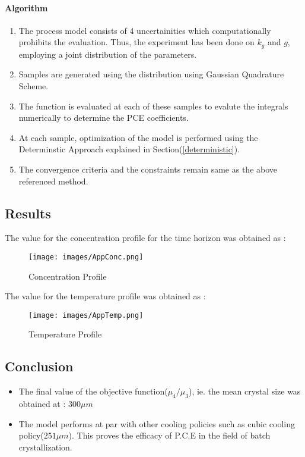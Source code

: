 \documentclass[3p,times,authoryear]{elsarticle}
\begin{document}
\paragraph{Algorithm}
\begin{enumerate}
\item The process model consists of 4 uncertainities which computationally prohibits the evaluation. Thus, the experiment has been done on $k_{g}$ and $g$, employing a joint distribution of the parameters.
\item Samples are generated using the distribution using Gaussian Quadrature Scheme.
\item The function is evaluated at each of these samples to evalute the integrals numerically to determine the PCE coefficients.
\item At each sample, optimization of the model is performed using the Determinstic Approach explained in Section(\ref{deterministic}).
\item The convergence criteria and the constraints remain same as the above referenced method.
\end{enumerate}

\subsection{Results}
The value for the concentration profile for the time horizon was obtained as :
\begin{figure}[h!] 
\begin{center}

\texttt{[image: images/AppConc.png]}
\end{center}
\caption{Concentration Profile}
\end{figure}

The value for the temperature profile was obtained as :
\begin{figure}[h!] 
\begin{center}
\texttt{[image: images/AppTemp.png]}
\end{center}
\caption{Temperature Profile}
\end{figure}

\subsection{Conclusion}

\begin{itemize}
\item The final value of the objective function($\mu_{4}/\mu_{3}$), ie. the mean crystal size was obtained at : $300 \mu m$
\item The model performs at par with other cooling policies such as cubic cooling policy($251 \mu m$)\cite{bhoi}. This proves the efficacy of P.C.E in the field of batch crystallization.
\end{itemize}
\end{document}
